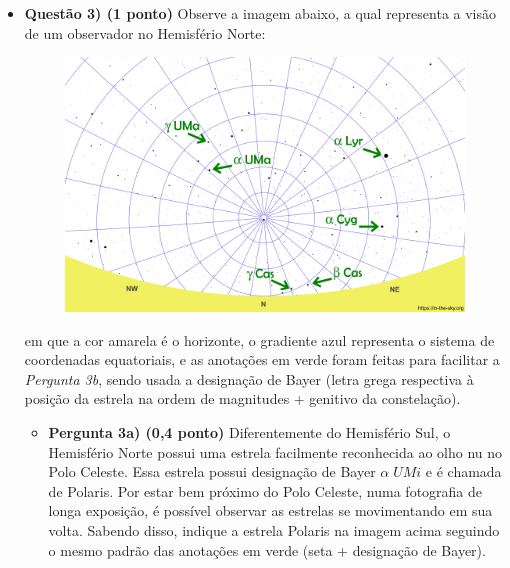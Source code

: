 \documentclass[a4paper, 12pt]{article}
\begin{document}
\begin{flushleft}
\begin{itemize}
\begin{itemize}
				\item \textbf{Pergunta 2b) (0,5 ponto)} O ponto $+$ no centro da imagem representa o Polo Celeste Sul. Sabendo disso, na perspectiva da carta, em qual sentido o céu se movimentaria com o passar do tempo?
					\begin{multicols}{2} \begin{itemize}
						\item[$(\quad)$] Sentido horário
						\item[$(\quad)$] Sentido anti-horário
					\end{itemize} \end{multicols}
			\end{itemize}
		
		\item \textbf{Questão 3) (1 ponto)} Observe a imagem abaixo, a qual representa a visão de um observador no Hemisfério Norte:
			\begin{figure}[H]
				\centering
				\includegraphics[scale=0.5]{./img/3.png}
			\end{figure}
			em que a cor amarela é o horizonte, o gradiente azul representa o sistema de coordenadas equatoriais, e as anotações em verde foram feitas para facilitar a \textit{Pergunta 3b}, sendo usada a designação de Bayer (letra grega respectiva à posição da estrela na ordem de magnitudes + genitivo da constelação).
			\begin{itemize}
				\item \textbf{Pergunta 3a) (0,4 ponto)} Diferentemente do Hemisfério Sul, o Hemisfério Norte possui uma estrela facilmente reconhecida ao olho nu no Polo Celeste. Essa estrela possui designação de Bayer $\alpha \; UMi$ e é chamada de Polaris. Por estar bem próximo do Polo Celeste, numa fotografia de longa exposição, é possível observar as estrelas se movimentando em sua volta. Sabendo disso, indique a estrela Polaris na imagem acima seguindo o mesmo padrão das anotações em verde (seta + designação de Bayer).

\end{itemize}
\end{itemize}
\end{flushleft}
\end{document}
